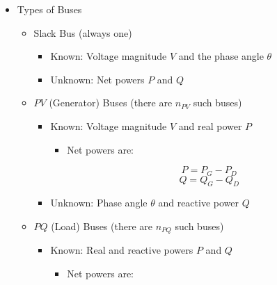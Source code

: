 \begin{itemize}

  \item Types of Buses

    \begin{itemize}

      \item Slack Bus (always one)

        \begin{itemize}

          \item Known: Voltage magnitude $V$ and the phase angle $\theta$

          \item Unknown: Net powers $P$ and $Q$

        \end{itemize}

      \item $PV$ (Generator) Buses (there are $n_{PV}$ such buses)

        \begin{itemize}

          \item Known: Voltage magnitude $V$ and real power $P$

            \begin{itemize}

              \item Net powers are:

                $$P=P_G-P_D$$
                $$Q=Q_G-Q_D$$

            \end{itemize}

          \item Unknown: Phase angle $\theta$ and reactive power $Q$

        \end{itemize}

      \item $PQ$ (Load) Buses (there are $n_{PQ}$ such buses)

        \begin{itemize}

          \item Known: Real and reactive powers $P$ and $Q$

            \begin{itemize}

              \item Net powers are:


\end{itemize}
\end{itemize}
\end{itemize}
\end{itemize}
